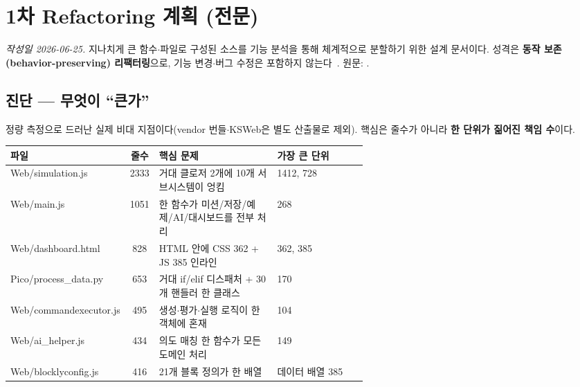 \chapter{1차 Refactoring 계획 (전문)}
\label{app:refactor1}

\textit{작성일 2026-06-25.} 지나치게 큰 함수$\cdot$파일로 구성된 소스를 기능 분석을
통해 체계적으로 분할하기 위한 설계 문서이다. 성격은 \textbf{동작 보존
(behavior-preserving) 리팩터링}으로, 기능 변경$\cdot$버그 수정은 포함하지
않는다~\cite{fowler2018refactoring, martin2008cleancode}. 원문:
.

\section{진단 --- 무엇이 ``큰가''}
정량 측정으로 드러난 실제 비대 지점이다(vendor 번들$\cdot$KSWeb은 별도 산출물로
제외). 핵심은 줄수가 아니라 \textbf{한 단위가 짊어진 책임 수}이다.

\begin{center}
\renewcommand{\arraystretch}{1.25}
\begin{tabularx}{\linewidth}{@{}>{\ttfamily\footnotesize}l c L{0.34\linewidth} >{\footnotesize}L{0.26\linewidth}@{}}
\toprule
\sffamily 파일 & \sffamily 줄수 & \sffamily 핵심 문제 & \sffamily 가장 큰 단위 \\
\midrule
Web/simulation.js     & 2333 & 거대 클로저 2개에 10개 서브시스템이 엉킴 &  1412,  728 \\
Web/main.js           & 1051 & 한 함수가 미션/저장/예제/AI/대시보드를 전부 처리 &  268 \\
Web/dashboard.html    & 828  & HTML 안에 CSS 362 + JS 385 인라인 &  362,  385 \\
Pico/process\_data.py & 653  & 거대 if/elif 디스패처 + 30개 핸들러 한 클래스 &  170 \\
Web/commandexecutor.js& 495  & 생성$\cdot$평가$\cdot$실행 로직이 한 객체에 혼재 &  104 \\
Web/ai\_helper.js     & 434  & 의도 매칭 한 함수가 모든 도메인 처리 &  149 \\
Web/blocklyconfig.js  & 416  & 21개 블록 정의가 한 배열 & 데이터 배열 385 \\
\bottomrule
\end{tabularx}
\end{center}

